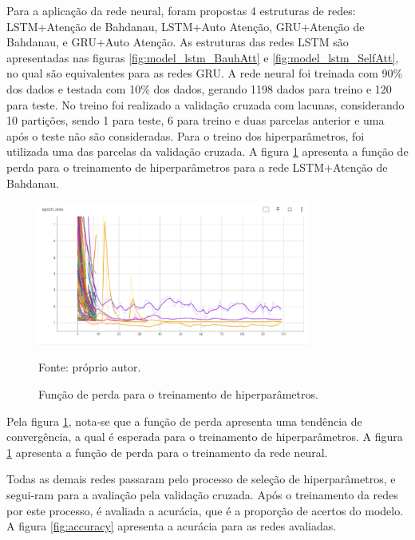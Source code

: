         \ipar Para a aplicação da rede neural, foram propostas 4 estruturas de redes: \acrshort{LSTM}+Atenção de Bahdanau, \acrshort{LSTM}+Auto Atenção, \acrshort{GRU}+Atenção de Bahdanau, e \acrshort{GRU}+Auto Atenção. As estruturas das redes \acrshort{LSTM} são apresentadas nas figuras \ref{fig:model_lstm_BauhAtt} e \ref{fig:model_lstm_SelfAtt}, no qual são equivalentes para as redes \acrshort{GRU}. A rede neural foi treinada com 90\% dos dados e testada com 10\% dos dados, gerando 1198 dados para treino e 120 para teste. No treino foi realizado a validação cruzada com lacunas, considerando 10 partições, sendo 1 para teste, 6 para treino e duas parcelas anterior e uma após o teste não são consideradas. Para o treino dos hiperparâmetros, foi utilizada uma das parcelas da validação cruzada. A figura \ref{fig:loss} apresenta a função de perda para o treinamento de hiperparâmetros para a rede \acrshort{LSTM}+Atenção de Bahdanau.

        \begin{figure}[H]
            \centering
            \caption{Função de perda para o treinamento de hiperparâmetros.}
            \label{fig:loss}
            \includegraphics[width=0.8\textwidth]{./imagens/epoch_loss.png}
            \par \footnotesize Fonte: próprio autor.
        \end{figure}

        \ipar Pela figura \ref{fig:loss}, nota-se que a função de perda apresenta uma tendência de convergência, a qual é esperada para o treinamento de hiperparâmetros. A figura \ref{fig:loss} apresenta a função de perda para o treinamento da rede neural.

        \ipar Todas as demais redes passaram pelo processo de seleção de hiperparâmetros, e segui-ram para a avaliação pela validação cruzada. Após o treinamento da redes por este processo, é avaliada a acurácia, que é a proporção de acertos do modelo. A figura \ref{fig:accuracy} apresenta a acurácia para as redes avaliadas.


